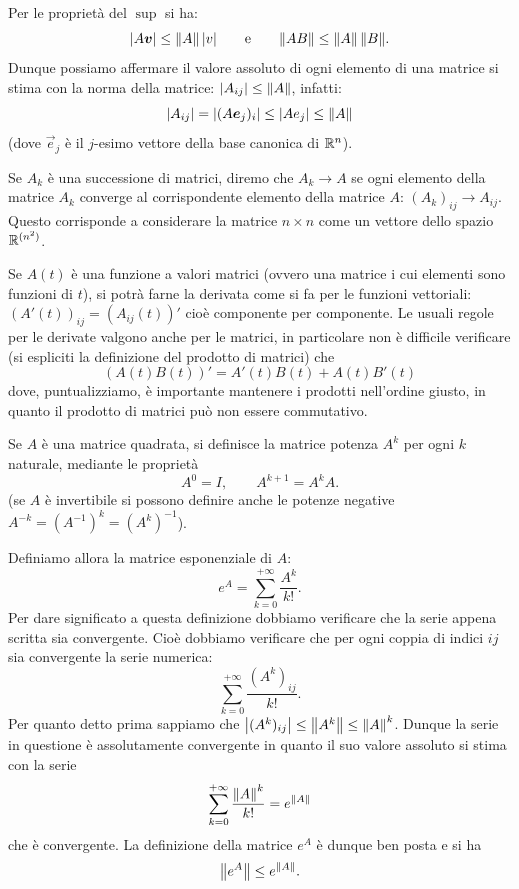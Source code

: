 Per le proprietà del $\sup$ si ha:
\[
  {\left|A\boldsymbol v\right|} \le {\left\Vert  A \right\Vert}\, {\left| v \right|}
\qquad\text{e}\qquad
  {\left\Vert  A B \right\Vert} \le {\left\Vert  A \right\Vert} \, {\left\Vert  B \right\Vert}.
\]
Dunque possiamo affermare il valore assoluto di ogni elemento di una
matrice si stima con la norma della matrice: ${\left| A_{ij}\right|} \le
{\left\Vert  A \right\Vert}$, infatti:
\[
  {\left| A_{ij} \right|} = {\left| (A \boldsymbol e_j)_i\right|} \le {\left| A e_j\right|}
  \le {\left\Vert  A \right\Vert}
\]
(dove $\vec e_j$ è il $j$-esimo vettore della base canonica di ${\mathbb R}^n$).

Se $A_k$ è una successione di matrici, diremo che $A_k\to A$ se ogni
elemento della matrice $A_k$ converge al corrispondente elemento della
matrice $A$: $(A_k)_{ij} \to A_{ij}$. Questo corrisponde a considerare
la matrice $n\times n$ come un vettore dello spazio ${\mathbb R}^{(n^2)}$.

Se $A(t)$ è una funzione a valori matrici (ovvero una matrice i cui
elementi sono funzioni di $t$), si potrà farne la derivata
come si fa per le funzioni vettoriali: $(A'(t))_{ij} = (A_{ij}(t))'$
cioè componente per componente. Le usuali regole per le derivate
valgono anche per le matrici, in particolare non è difficile
verificare (si espliciti la definizione del prodotto di matrici) che
\[
 (A(t)B(t))' = A'(t) B(t) + A(t) B'(t)
\]
dove, puntualizziamo, è importante mantenere i prodotti nell'ordine
giusto, in quanto il prodotto di matrici può non essere commutativo.

Se $A$ è una matrice quadrata, si definisce la matrice potenza $A^k$
per ogni $k$ naturale, mediante le proprietà
\[
  A^0 = I, \qquad A^{k+1} = A^kA.
\]
(se $A$ è invertibile si possono definire anche le potenze negative
$A^{-k}=(A^{-1})^k = (A^k)^{-1}$).

Definiamo allora la matrice esponenziale di $A$:
\[
  e^A = \sum_{k=0}^{+\infty} \frac{A^k}{k!}.
\]
Per dare significato a questa definizione dobbiamo verificare che la
serie appena scritta sia convergente. Cioè dobbiamo verificare che per
ogni coppia di indici $ij$ sia convergente la serie numerica:
\[
 \sum_{k=0}^{+\infty} \frac{(A^k)_{ij}}{k!}.
\]
Per quanto detto prima sappiamo che
${\left|(A^k)_{ij}\right|} \le {\left\Vert A^k\right\Vert} \le {\left\Vert A\right\Vert}^k$.
Dunque la serie in questione è
assolutamente convergente in quanto il suo valore assoluto si stima
con la serie
\[
 \sum_{k=0}^{+\infty} \frac{{\left\Vert  A\right\Vert}^k}{k!} = e^{{\left\Vert  A\right\Vert}}
\]
che è convergente. La definizione della matrice $e^A$ è dunque
ben posta e si ha
\[
 {\left\Vert  e^A\right\Vert} \le e^{{\left\Vert  A \right\Vert}}.
\]

